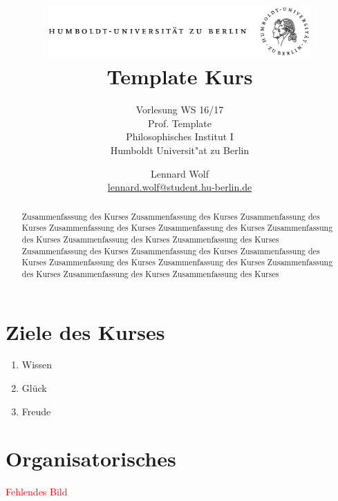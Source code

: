 \documentclass[]{scrartcl}
\begin{document}
\title{
	\includegraphics*[width=0.75\textwidth]{images/hu_logo.png}\\
	\vspace{24pt}
	Template Kurs}
\subtitle{Vorlesung WS 16/17\\
          Prof. Template\\
          Philosophisches Institut I \\ 
          Humboldt Universit"at zu Berlin}
\author{Lennard Wolf\\
        \href{mailto:lennard.wolf@student.hu-berlin.de}{lennard.wolf@student.hu-berlin.de}}
\maketitle
\begin{abstract}

Zusammenfassung des Kurses Zusammenfassung des Kurses Zusammenfassung des Kurses Zusammenfassung des Kurses Zusammenfassung des Kurses Zusammenfassung des Kurses Zusammenfassung des Kurses Zusammenfassung des Kurses Zusammenfassung des Kurses Zusammenfassung des Kurses Zusammenfassung des Kurses Zusammenfassung des Kurses Zusammenfassung des Kurses Zusammenfassung des Kurses Zusammenfassung des Kurses Zusammenfassung des Kurses 

\end{abstract}
\newpage

\tableofcontents
\newpage

\listoffigures
\newpage


\section{Ziele des Kurses}
\begin{enumerate}
  \item Wissen
  \item Glück
  \item Freude
\end{enumerate}

\section{Organisatorisches}

\textcolor{red}{Fehlendes Bild}
\end{document}
